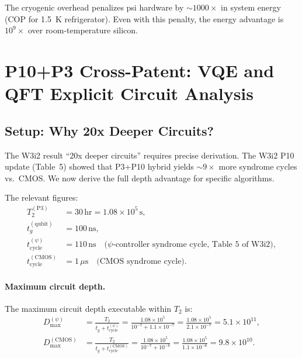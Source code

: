 \documentclass[11pt]{article}
\theoremstyle{definition}
\theoremstyle{remark}
\begin{document}
The cryogenic overhead penalizes psi hardware by $\sim1000\times$ in
system energy (COP for 1.5~K refrigerator). Even with this penalty, the
energy advantage is $10^9\times$ over room-temperature silicon.

\section{P10+P3 Cross-Patent: VQE and QFT Explicit Circuit Analysis}
\label{sec:vqe_qft}

\subsection{Setup: Why 20x Deeper Circuits?}

The W3i2 result ``20x deeper circuits'' requires precise derivation.
The W3i2 P10 update (Table~5) showed that P3+P10 hybrid yields
$\sim9\times$ more syndrome cycles vs.\ CMOS. We now derive the full
depth advantage for specific algorithms.

The relevant figures:
\begin{align}
T_2^{(\mathrm{P3})} &= 30\,\mathrm{hr} = 1.08\times10^5\,\mathrm{s}, \\
t_g^{(\mathrm{qubit})} &= 100\,\mathrm{ns}, \\
t_{\mathrm{cycle}}^{(\psi)} &= 110\,\mathrm{ns}
\quad\text{($\psi$-controller syndrome cycle, Table 5 of W3i2)}, \\
t_{\mathrm{cycle}}^{(\mathrm{CMOS})} &= 1\,\mu\mathrm{s}
\quad\text{(CMOS syndrome cycle)}.
\end{align}

\paragraph{Maximum circuit depth.}
The maximum circuit depth executable within $T_2$ is:
\begin{align}
D_{\max}^{(\psi)} &= \frac{T_2}{t_g + t_{\mathrm{cycle}}^{(\psi)}}
= \frac{1.08\times10^5}{10^{-7} + 1.1\times10^{-7}}
= \frac{1.08\times10^5}{2.1\times10^{-7}}
= 5.1\times10^{11}, \label{eq:depth_psi} \\
D_{\max}^{(\mathrm{CMOS})} &= \frac{T_2}{t_g + t_{\mathrm{cycle}}^{(\mathrm{CMOS})}}
= \frac{1.08\times10^5}{10^{-7} + 10^{-6}}
= \frac{1.08\times10^5}{1.1\times10^{-6}}
= 9.8\times10^{10}. \label{eq:depth_cmos}
\end{align}
\end{document}
